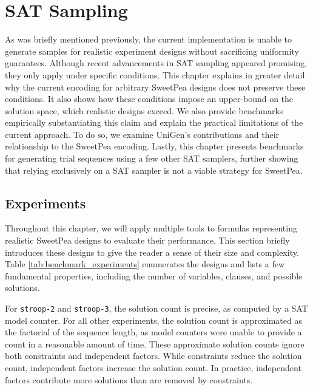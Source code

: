 
\chapter{SAT Sampling}

As was briefly mentioned previously, the current implementation is unable to generate samples for realistic experiment designs without sacrificing uniformity guarantees. Although recent advancements in SAT sampling appeared promising, they only apply under specific conditions. This chapter explains in greater detail why the current encoding for arbitrary SweetPea designs does not preserve these conditions. It also shows how these conditions impose an upper-bound on the solution space, which realistic designs exceed. We also provide benchmarks empirically substantiating this claim and explain the practical limitations of the current approach. To do so, we examine UniGen's contributions and their relationship to the SweetPea encoding. Lastly, this chapter presents benchmarks for generating trial sequences using a few other SAT samplers, further showing that relying exclusively on a SAT sampler is not a viable strategy for SweetPea.


\section{Experiments}

Throughout this chapter, we will apply multiple tools to formulas representing realistic SweetPea designs to evaluate their performance. This section briefly introduces these designs to give the reader a sense of their size and complexity. Table \ref{tab:benchmark_experiments} enumerates the designs and lists a few fundamental properties, including the number of variables, clauses, and possible solutions.

For \texttt{stroop-2} and \texttt{stroop-3}, the solution count is precise, as computed by a SAT model counter. For all other experiments, the solution count is approximated as the factorial of the sequence length, as model counters were unable to provide a count in a reasonable amount of time. These approximate solution counts ignore both constraints and independent factors. While constraints reduce the solution count, independent factors increase the solution count. In practice, independent factors contribute more solutions than are removed by constraints.

